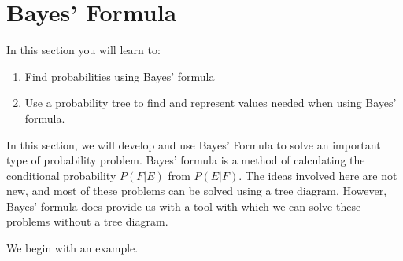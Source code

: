 \section{Bayes' Formula}
In this section you will learn to:
\begin{enumerate}
    \item Find probabilities using Bayes' formula
    \item Use a probability tree to find and represent values needed when using Bayes' formula.
\end{enumerate}
In this section, we will develop and use Bayes' Formula to solve an important type of probability problem. Bayes' formula is a method of calculating the conditional probability \( P(F | E) \) from \( P(E | F) \). The ideas involved here are not new, and most of these problems can be solved using a tree diagram. However, Bayes' formula does provide us with a tool with which we can solve these problems without a tree diagram.

We begin with an example.

